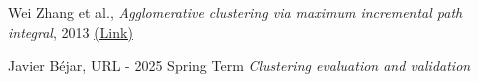 \documentclass[
	10pt,
	parskip=half-,	
	paper=a4,
	english
	]{scrartcl}
\begin{document}
\renewcommand{\section}[2]{}%
\begin{thebibliography}{9}

Wei Zhang et al.,
\textit{Agglomerative clustering via maximum incremental path integral}, 2013
\href{https://www.sciencedirect.com/science/article/pii/S0031320313001830}{(Link)}

Javier Béjar,
URL - 2025 Spring Term
\textit{Clustering evaluation and validation}

\end{thebibliography}
\end{document}
